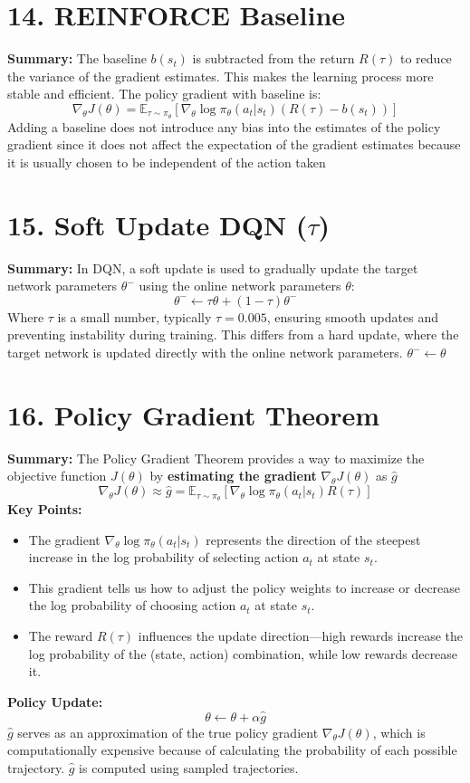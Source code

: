 \documentclass[letterpaper,10pt]{article}
\begin{document}
\begin{multicols}{2}
\section*{14. REINFORCE Baseline}
\textbf{Summary:} The baseline \( b(s_t) \) is subtracted from the return \( R(\tau) \) to reduce the variance of the gradient estimates. This makes the learning process more stable and efficient. The policy gradient with baseline is:
\[
\nabla_\theta J(\theta) = \mathbb{E}_{\tau \sim \pi_\theta} \left[ \nabla_\theta \log \pi_\theta(a_t | s_t) (R(\tau) - b(s_t)) \right]
\]
Adding a baseline does not introduce any bias into the estimates of the policy gradient since it does not affect the expectation of the gradient estimates because it is usually chosen to be independent of the action taken

\section*{15. Soft Update DQN (\(\tau\))}
\textbf{Summary:} In DQN, a soft update is used to gradually update the target network parameters \( \theta^- \) using the online network parameters \( \theta \):
\[
\theta^- \leftarrow \tau \theta + (1 - \tau) \theta^-
\]
Where \( \tau \) is a small number, typically \( \tau = 0.005 \), ensuring smooth updates and preventing instability during training. This differs from a hard update, where the target network is updated directly with the online network parameters. \( \theta^- \leftarrow \theta \)

\section*{16. Policy Gradient Theorem}
\textbf{Summary:} The Policy Gradient Theorem provides a way to maximize the objective function \( J(\theta) \) by \textbf{estimating the gradient} \( \nabla_\theta J(\theta) \) as \( \hat{g} \)
\[
\nabla_\theta J(\theta) \approx \hat{g} = \mathbb{E}_{\tau \sim \pi_\theta} \left[ \nabla_\theta \log \pi_\theta(a_t | s_t) R(\tau) \right]
\]
\textbf{Key Points:}
\begin{itemize}
    \item The gradient \( \nabla_\theta \log \pi_\theta(a_t | s_t) \) represents the direction of the steepest increase in the log probability of selecting action \( a_t \) at state \( s_t \).
    \item This gradient tells us how to adjust the policy weights to increase or decrease the log probability of choosing action \( a_t \) at state \( s_t \).
    \item The reward \( R(\tau) \) influences the update direction—high rewards increase the log probability of the (state, action) combination, while low rewards decrease it.
\end{itemize}
\textbf{Policy Update:}
\[
\theta \leftarrow \theta + \alpha \hat{g}
\]
\( \hat{g} \) serves as an approximation of the true policy gradient \( \nabla_\theta J(\theta) \), which is computationally expensive because of calculating the probability of each possible trajectory. \( \hat{g} \) is computed using sampled trajectories.


\end{multicols}
\end{document}
